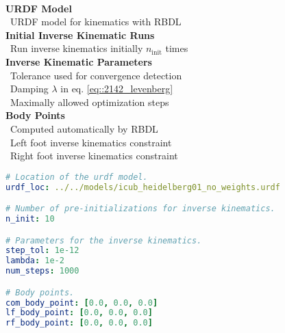\\
\begin{minipage}[t]{1.\textwidth}
	\begin{minipage}{0.4\textwidth}
		\scriptsize{
			\hfill \textbf{URDF Model}\\
			\mbox{}~\hfill URDF model for kinematics with RBDL\\
			
			\hfill \textbf{Initial Inverse Kinematic Runs}\\
			\mbox{}~\hfill Run inverse kinematics initially $n_\text{init}$ times\\
			
			\hfill \textbf{Inverse Kinematic Parameters}\\
			\mbox{}~\hfill Tolerance used for convergence detection\\
			\mbox{}~\hfill Damping $\lambda$ in eq. \ref{eq::2142_levenberg}\\
			\mbox{}~\hfill Maximally allowed optimization steps\\
			
			\hfill \textbf{Body Points}\\
			\mbox{}~\hfill Computed automatically by RBDL\\
			\mbox{}~\hfill Left foot inverse kinematics constraint\\
			\mbox{}~\hfill Right foot inverse kinematics constraint}
	\end{minipage}
	\begin{minipage}{0.6\textwidth}
		\begin{lstlisting}[language=yaml]
# Location of the urdf model.
urdf_loc: ../../models/icub_heidelberg01_no_weights.urdf

# Number of pre-initializations for inverse kinematics.
n_init: 10

# Parameters for the inverse kinematics.
step_tol: 1e-12
lambda: 1e-2
num_steps: 1000

# Body points.
com_body_point: [0.0, 0.0, 0.0]
lf_body_point: [0.0, 0.0, 0.0]
rf_body_point: [0.0, 0.0, 0.0]
		\end{lstlisting}
	\end{minipage}
\end{minipage}
